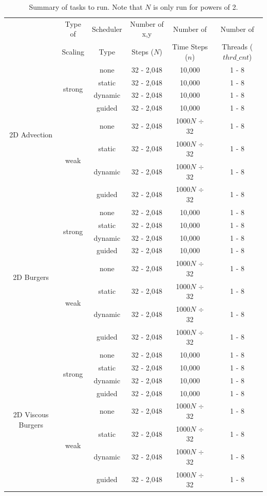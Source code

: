 \documentclass{article}
\begin{document}
\begin{table}[t]
\begin{center}
\begin{tabular}{ |c|c|c|c|c|c| } 
\hline
 & Type of  & Scheduler & Number of x,y & Number of & Number of \\
 & Scaling  & Type & Steps ($N$) & Time Steps ($n$) &  Threads ($thrd\_cnt$) \\

\hline
\multirow{8}{4em}{2D Advection} & \multirow{4}{4em}{strong}& none & 32 - 2,048 & 10,000 & 1 - 8 \\ 
& & static & 32 - 2,048 & 10,000 & 1 - 8 \\
& & dynamic & 32 - 2,048 & 10,000 & 1 - 8 \\ 
&  & guided & 32 - 2,048 & 10,000 & 1 - 8 \\ 
& \multirow{4}{4em}{weak}& none & 32 - 2,048 & 1000$N$ $\div$ 32 & 1 - 8 \\ 
& & static & 32 - 2,048 & 1000$N$ $\div$ 32 & 1 - 8 \\
& & dynamic & 32 - 2,048 & 1000$N$ $\div$ 32 & 1 - 8 \\ 
&  & guided & 32 - 2,048 & 1000$N$ $\div$ 32 & 1 - 8 \\ 
\hline
\multirow{8}{4em}{2D Burgers} & \multirow{4}{4em}{strong}& none & 32 - 2,048 & 10,000 & 1 - 8 \\ 
& & static & 32 - 2,048 & 10,000 & 1 - 8 \\
& & dynamic & 32 - 2,048 & 10,000 & 1 - 8 \\ 
&  & guided & 32 - 2,048 & 10,000 & 1 - 8 \\ 
& \multirow{4}{4em}{weak}& none & 32 - 2,048 & 1000$N$ $\div$ 32 & 1 - 8 \\ 
& & static & 32 - 2,048 & 1000$N$ $\div$ 32 & 1 - 8 \\
& & dynamic & 32 - 2,048 & 1000$N$ $\div$ 32 & 1 - 8 \\ 
&  & guided & 32 - 2,048 & 1000$N$ $\div$ 32 & 1 - 8 \\ 
\hline
\multirow{8}{4em}{2D Viscous Burgers} & \multirow{4}{4em}{strong}& none & 32 - 2,048 & 10,000 & 1 - 8 \\ 
& & static & 32 - 2,048 & 10,000 & 1 - 8 \\
& & dynamic & 32 - 2,048 & 10,000 & 1 - 8 \\ 
&  & guided & 32 - 2,048 & 10,000 & 1 - 8 \\ 
& \multirow{4}{4em}{weak}& none & 32 - 2,048 & 1000$N$ $\div$ 32 & 1 - 8 \\ 
& & static & 32 - 2,048 & 1000$N$ $\div$ 32 & 1 - 8 \\
& & dynamic & 32 - 2,048 & 1000$N$ $\div$ 32 & 1 - 8 \\ 
&  & guided & 32 - 2,048 & 1000$N$ $\div$ 32 & 1 - 8 \\ 
\hline
\end{tabular}
\end{center}
\caption{Summary of tasks to run. Note that $N$ is only run for powers of 2.}
\label{Table_Timing_Summary}
\end{table}
\end{document}
